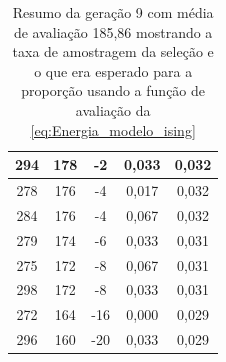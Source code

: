 \begin{table}[htb]
\begin{tabular}{|c|c|c|c|c|}
		294	&  178	&  -2 	&  0,033	&  0,032 \\ \hline 
		278	&  176	&  -4 	&  0,017	&  0,032 \\ \hline 
		284	&  176	&  -4 	&  0,067	&  0,032 \\ \hline 
		279	&  174	&  -6 	&  0,033	&  0,031 \\ \hline 
		275	&  172	&  -8 	&  0,067	&  0,031 \\ \hline 
		298	&  172	&  -8 	&  0,033	&  0,031 \\ \hline 
		272	&  164	&  -16 	&  0,000	&  0,029 \\ \hline 
		296	&  160	&  -20 	&  0,033	&  0,029 \\
		\hline
	\end{tabular}
	\caption{Resumo da geração 9 com média de avaliação 185,86 mostrando a taxa de amostragem da seleção e o que era esperado para a proporção usando a função de avaliação da \autoref{eq:Energia_modelo_ising}}
	\label{tab:resumo_GA_H}
\end{table}

